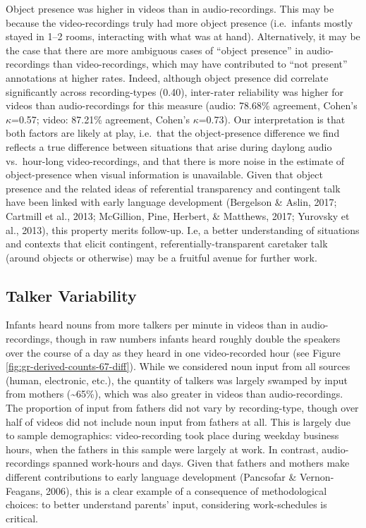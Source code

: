 \documentclass[man]{apa6}
\theoremstyle{definition}
\theoremstyle{definition}
\theoremstyle{definition}
\theoremstyle{remark}
\begin{document}
Object presence was higher in videos than in audio-recordings. This may
be because the video-recordings truly had more object presence
(i.e.~infants mostly stayed in 1--2 rooms, interacting with what was at
hand). Alternatively, it may be the case that there are more ambiguous
cases of \enquote{object presence} in audio-recordings than
video-recordings, which may have contributed to \enquote{not present}
annotations at higher rates. Indeed, although object presence did
correlate significantly across recording-types (0.40), inter-rater
reliability was higher for videos than audio-recordings for this measure
(audio: 78.68\% agreement, Cohen's \(\kappa\)=0.57; video: 87.21\%
agreement, Cohen's \(\kappa\)=0.73). Our interpretation is that both
factors are likely at play, i.e.~that the object-presence difference we
find reflects a true difference between situations that arise during
daylong audio vs.~hour-long video-recordings, and that there is more
noise in the estimate of object-presence when visual information is
unavailable. Given that object presence and the related ideas of
referential transparency and contingent talk have been linked with early
language development (Bergelson \& Aslin, 2017; Cartmill et al., 2013;
McGillion, Pine, Herbert, \& Matthews, 2017; Yurovsky et al., 2013),
this property merits follow-up. I.e, a better understanding of
situations and contexts that elicit contingent,
referentially-transparent caretaker talk (around objects or otherwise)
may be a fruitful avenue for further work.

\subsection{Talker Variability}\label{talker-variability}

Infants heard nouns from more talkers per minute in videos than in
audio-recordings, though in raw numbers infants heard roughly double the
speakers over the course of a day as they heard in one video-recorded
hour (see Figure \ref{fig:gr-derived-counts-67-diff}). While we
considered noun input from all sources (human, electronic, etc.), the
quantity of talkers was largely swamped by input from mothers
(\textasciitilde{}65\%), which was also greater in videos than
audio-recordings. The proportion of input from fathers did not vary by
recording-type, though over half of videos did not include noun input
from fathers at all. This is largely due to sample demographics:
video-recording took place during weekday business hours, when the
fathers in this sample were largely at work. In contrast,
audio-recordings spanned work-hours and days. Given that fathers and
mothers make different contributions to early language development
(Pancsofar \& Vernon-Feagans, 2006), this is a clear example of a
consequence of methodological choices: to better understand parents'
input, considering work-schedules is critical.
\end{document}
